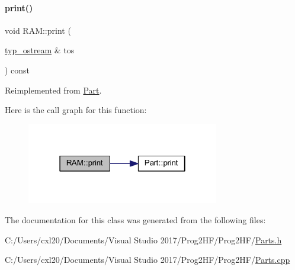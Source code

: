 \paragraph{\texorpdfstring{print()}{print()}\hspace{0.1cm}{\footnotesize\ttfamily [4/4]}}
{\footnotesize\ttfamily void R\+A\+M\+::print (\begin{DoxyParamCaption}\item[{\mbox{\hyperlink{structtyp__ostream}{typ\+\_\+ostream}} \&}]{tos }\end{DoxyParamCaption}) const\hspace{0.3cm}{\ttfamily [virtual]}}



Reimplemented from \mbox{\hyperlink{class_part_ab6396030e8b7a724731a8b54bd4942fc}{Part}}.

Here is the call graph for this function\+:
\nopagebreak
\begin{figure}[H]
\begin{center}
\leavevmode
\includegraphics[width=238pt]{class_r_a_m_ad43f71c742f078c98ab7fd9a26420c97_cgraph}
\end{center}
\end{figure}


The documentation for this class was generated from the following files\+:\begin{DoxyCompactItemize}
\item 
C\+:/\+Users/cxl20/\+Documents/\+Visual Studio 2017/\+Prog2\+H\+F/\+Prog2\+H\+F/\mbox{\hyperlink{_parts_8h}{Parts.\+h}}\item 
C\+:/\+Users/cxl20/\+Documents/\+Visual Studio 2017/\+Prog2\+H\+F/\+Prog2\+H\+F/\mbox{\hyperlink{_parts_8cpp}{Parts.\+cpp}}\end{DoxyCompactItemize}
